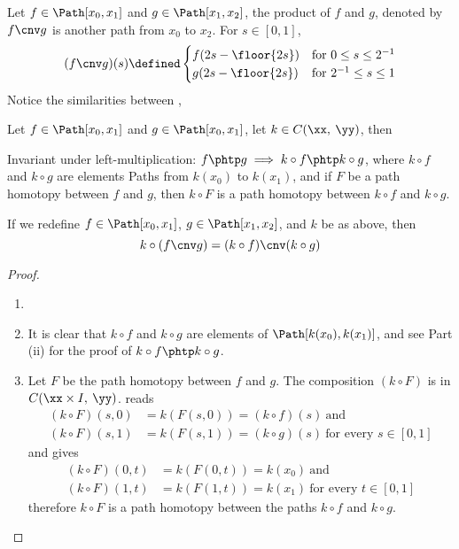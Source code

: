 \documentclass[../main-v2-manifolds.tex]{subfiles}
\begin{document}
\begin{definition}\label{munkres:product-of-paths}
    Let $f\in\Path[x_0,x_1]$ and $g\in\Path[x_1,x_2]$, the product of $f$ and $g$, denoted by $f\cnv g$ is another path from $x_0$ to $x_2$. For $s\in[0,1]$, 
    \begin{equation}\label{munkres:product-of-paths-equation}
        (f\cnv g)(s) \defined\begin{cases}
            f(2s-\floor{2s}) & \text{for } 0\leq s\leq 2^{-1}\\
            g(2s-\floor{2s}) & \text{for } 2^{-1}\leq s\leq 1\\
        \end{cases}
    \end{equation}
    Notice the similarities between , 
\end{definition}
\begin{wts}
    Let $f\in\Path[x_0,x_1]$ and $g\in\Path[x_0,x_1]$, let $k\in C(\xx,\: \yy)$, then
    \begin{enumroman}
        \item Invariant under left-multiplication: $f\phtp g\implies k\circ f\phtp k\circ g$, where $k\circ f$ and $k\circ g$ are elements Paths from $k(x_0)$ to $k(x_1)$, and if $F$ be a path homotopy between $f$ and $g$, then $k\circ F$ is a path homotopy between $k\circ f$ and $k\circ g$.
        \item If we redefine $f\in\Path[x_0,x_1]$, $g\in\Path[x_1,x_2]$, and $k$ be as above, then 
        \[
            k\circ(f\cnv g)=(k\circ f)\cnv(k\circ g)
        \]
    \end{enumroman}
\end{wts}
\begin{proof}
        \begin{enumerate}[label={Proof of Part (\roman*): },leftmargin=*]
        \item[]
        \item It is clear that $k\circ f$ and $k\circ g$ are elements of $\Path[k(x_0),k(x_1)]$, and see Part (ii) for the proof of $k\circ f\phtp k\circ g$.
        \item Let $F$ be the path homotopy between $f$ and $g$. The composition $(k\circ F)$ is in $C(\xx\times I,\: \yy)$.  reads
        \begin{align*}
            (k\circ F)(s,0)&=k(F(s,0))=(k\circ f)(s)\: \text{and}\\ 
            (k\circ F)(s,1)&=k(F(s,1))=(k\circ g)(s)\: \text{for every }s\in[0,1]
        \end{align*}    
        and  gives
        \begin{align*}
            (k\circ F)(0,t)&=k(F(0,t))=k(x_0)\: \text{and}\\
            (k\circ F)(1,t)&=k(F(1,t))=k(x_1)\: \text{for every }t\in[0,1]
        \end{align*}    
        therefore $k\circ F$ is a path homotopy between the paths $k\circ f$ and $k\circ g$.
    \end{enumerate}
\end{proof}
\end{document}
